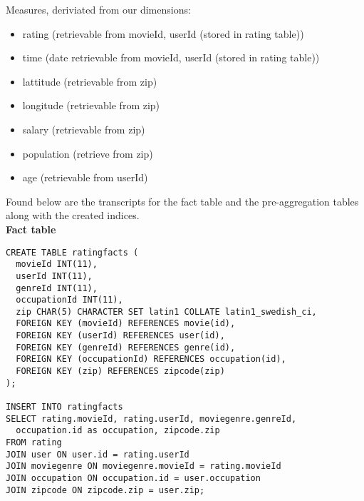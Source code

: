 \noindent Measures, deriviated from our dimensions:

\begin{itemize}
  \item rating (retrievable from movieId, userId (stored in rating table))
  \item time (date retrievable from movieId, userId (stored in rating table))
  \item lattitude (retrievable from zip)
  \item longitude (retrievable from zip)
  \item salary (retrievable from zip)
  \item population (retrieve from zip)
  \item age (retrievable from userId)
\end{itemize}

\noindent Found below are the transcripts for the fact table and the pre-aggregation tables along with the created indices. \\

\noindent\textbf{Fact table} \\
\begin{lstlisting}
CREATE TABLE ratingfacts (
  movieId INT(11),
  userId INT(11),
  genreId INT(11),
  occupationId INT(11),
  zip CHAR(5) CHARACTER SET latin1 COLLATE latin1_swedish_ci,
  FOREIGN KEY (movieId) REFERENCES movie(id),
  FOREIGN KEY (userId) REFERENCES user(id),
  FOREIGN KEY (genreId) REFERENCES genre(id),
  FOREIGN KEY (occupationId) REFERENCES occupation(id),
  FOREIGN KEY (zip) REFERENCES zipcode(zip)
);

INSERT INTO ratingfacts
SELECT rating.movieId, rating.userId, moviegenre.genreId, 
  occupation.id as occupation, zipcode.zip
FROM rating
JOIN user ON user.id = rating.userId
JOIN moviegenre ON moviegenre.movieId = rating.movieId
JOIN occupation ON occupation.id = user.occupation
JOIN zipcode ON zipcode.zip = user.zip;
\end{lstlisting}

